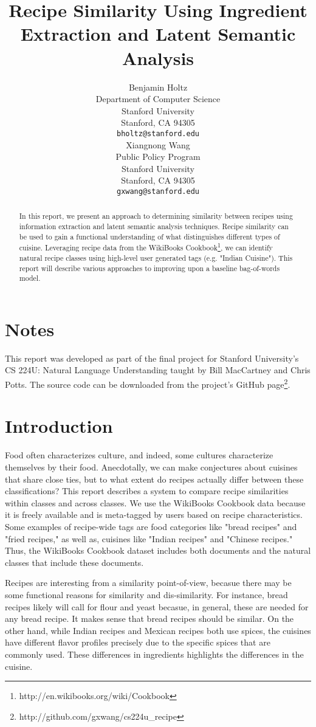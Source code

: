 \documentclass[11pt]{article}
\title{Recipe Similarity Using Ingredient Extraction and Latent Semantic Analysis}
\author{Benjamin Holtz \\
  Department of Computer Science \\
  Stanford University \\
  Stanford, CA 94305 \\
  {\tt bholtz@stanford.edu} \\\And
  Xiangnong Wang \\
  Public Policy Program \\
  Stanford University \\
  Stanford, CA 94305 \\
  {\tt gxwang@stanford.edu} \\}
\date{}
\begin{document}
\maketitle
\begin{abstract}
  In this report, we present an approach to determining similarity between recipes using information extraction and latent semantic analysis techniques.
Recipe similarity can be used to gain a functional understanding of what distinguishes different types of cuisine. Leveraging recipe data from the WikiBooks Cookbook\footnote{http://en.wikibooks.org/wiki/Cookbook}, we can identify natural recipe classes using high-level user generated tags (e.g. "Indian Cuisine"). 
This report will describe various approaches to improving upon a baseline bag-of-words model.
\end{abstract}

\section{Notes}
This report was developed as part of the final project for Stanford University's CS 224U: Natural Language Understanding taught by Bill MacCartney and Chris Potts. The source code can be downloaded from the project's GitHub page\footnote{http://github.com/gxwang/cs224u\_recipe}.

\section{Introduction}
Food often characterizes culture, and indeed, some cultures characterize themselves by their food. Anecdotally, we can make conjectures about cuisines that share close ties, but to what extent do recipes actually differ between these classifications? This report describes a system to compare recipe similarities within classes and across classes. We use the WikiBooks Cookbook data because it is freely available and is meta-tagged by users based on recipe characteristics. Some examples of recipe-wide tags are food categories like "bread recipes" and "fried recipes," as well as, cuisines like "Indian recipes" and "Chinese recipes." Thus, the WikiBooks Cookbook dataset includes both documents and the natural classes that include these documents. 

Recipes are interesting from a similarity point-of-view, becasue there may be some functional reasons for similarity and dis-similarity. For instance, bread recipes likely will call for flour and yeast becasue, in general, these are needed for any bread recipe. It makes sense that bread recipes should be similar. On the other hand, while Indian recipes and Mexican recipes both use spices, the cuisines have different flavor profiles precisely due to the specific spices that are commonly used. These differences in ingredients highlights the differences in the cuisine.
\end{document}
